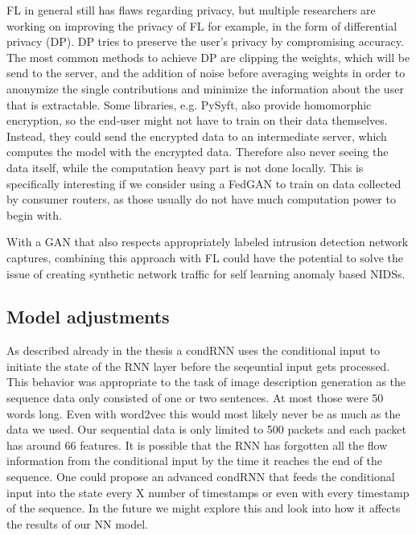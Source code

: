 \documentclass[
	ngerman,
	ruledheaders=section,%
	class=report,%
	thesis={type=bachelor},%
	accentcolor=9c,%
	custommargins=true,%
	marginpar=false,%
	parskip=half-,%
	fontsize=11pt,%
]{tudapub}
\begin{document}
FL in general still has flaws regarding privacy, but multiple researchers are working on improving the privacy of FL for example, in the form of differential privacy (DP).
DP tries to preserve the user's privacy by compromising accuracy.
The most common methods to achieve DP are clipping the weights, which will be send to the server, and the addition of noise before averaging weights in order to anonymize the single contributions and minimize the information about the user that is extractable.
Some libraries, e.g. PySyft, also provide homomorphic encryption, so the end-user might not have to train on their data themselves.
Instead, they could send the encrypted data to an intermediate server, which computes the model with the encrypted data.
Therefore also never seeing the data itself, while the computation heavy part is not done locally.
This is specifically interesting if we consider using a FedGAN to train on data collected by consumer routers,
as those usually do not have much computation power to begin with.

With a GAN that also respects appropriately labeled intrusion detection network captures,
combining this approach with FL could have the potential to solve the issue of creating synthetic network traffic for self learning anomaly based NIDSs.

\subsection{Model adjustments}

As described already in the thesis a condRNN uses the conditional input to initiate the state of the RNN layer before the seqeuntial input gets processed.
This behavior was appropriate to the task of image description generation \cite{vinyalsShowTellNeural2015} \cite{karpathyDeepVisualSemanticAlignments2015} as the sequence data only consisted of one or two sentences.
At most those were 50 words long.
Even with word2vec this would most likely never be as much as the data we used.
Our sequential data is only limited to 500 packets and each packet has around 66 features.
It is possible that the RNN has forgotten all the flow information from the conditional input by the time it reaches the end of the sequence.
One could propose an advanced condRNN that feeds the conditional input into the state every X number of timestamps or even with every timestamp of the sequence.
In the future we might explore this and look into how it affects the results of our NN model.
\end{document}
